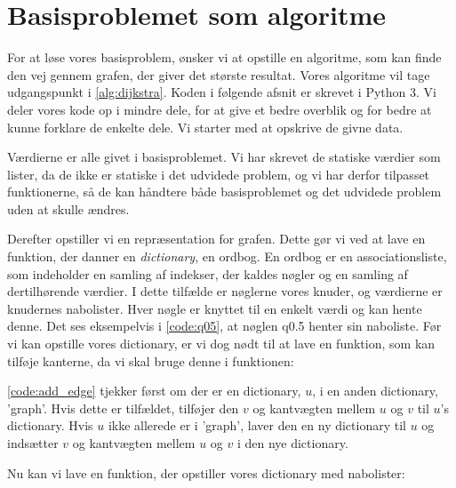 \section{Basisproblemet som algoritme}
For at løse vores basisproblem, ønsker vi at opstille en algoritme, som kan finde den vej gennem grafen, der giver det største resultat. Vores algoritme vil tage udgangspunkt i \autoref{alg:dijkstra}. Koden i følgende afsnit er skrevet i Python 3. Vi deler vores kode op i mindre dele, for at give et bedre overblik og for bedre at kunne forklare de enkelte dele. Vi starter med at opskrive de givne data. 



Værdierne er alle givet i basisproblemet. Vi har skrevet de statiske værdier som lister, da de ikke er statiske i det udvidede problem, og vi har derfor tilpasset funktionerne, så de kan håndtere både basisproblemet og det udvidede problem uden at skulle ændres. 

Derefter opstiller vi en repræsentation for grafen. Dette gør vi ved at lave en funktion, der danner en \emph{dictionary}, en ordbog. En ordbog er en associationsliste, som indeholder en samling af indekser, der kaldes nøgler og en samling af dertilhørende værdier. I dette tilfælde er nøglerne vores knuder, og
værdierne er knudernes nabolister. Hver nøgle er knyttet til en enkelt værdi og kan hente denne. Det ses eksempelvis i \autoref{code:q05}, at nøglen q0.5 henter sin naboliste.
Før vi kan opstille vores dictionary, er vi dog nødt til at lave en funktion, som kan tilføje kanterne, da vi skal bruge denne i funktionen:



\autoref{code:add_edge} tjekker først om der er en dictionary, $u$, i en anden dictionary, 'graph'. Hvis dette er tilfældet, tilføjer den $v$ og kantvægten mellem $u$ og $v$ til  $u$'s dictionary. Hvis $u$ ikke allerede er i 'graph', laver den en ny dictionary til $u$ og indsætter $v$ og kantvægten mellem $u$ og $v$ i den nye dictionary.

Nu kan vi lave en funktion, der opstiller vores dictionary med nabolister:



